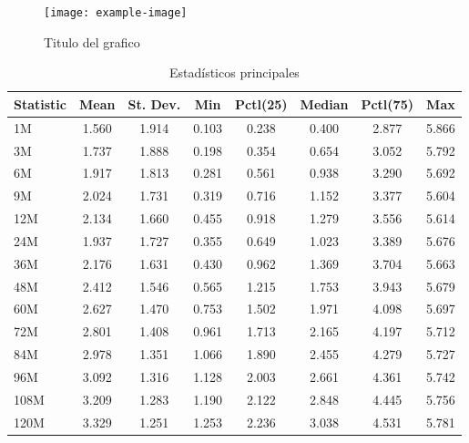 \documentclass{beamer}
\begin{document}
\begin{frame}
    \begin{figure}
        \caption{Titulo del grafico}
        \label{grafico_1}
        \texttt{[image: example-image]}
    \end{figure}
\end{frame}


\begin{frame}
    \begin{table} 
        \caption{Estadísticos principales} 
        \label{estadisticos} 
        \small
        \begin{tabular}{lccccccc}
            \toprule
            Statistic & Mean & St. Dev. & Min & Pctl(25) & Median & Pctl(75) & Max \\ 
            \midrule 
            1M & 1.560 & 1.914 & 0.103 & 0.238 & 0.400 & 2.877 & 5.866 \\ 
            3M & 1.737 & 1.888 & 0.198 & 0.354 & 0.654 & 3.052 & 5.792 \\ 
            6M & 1.917 & 1.813 & 0.281 & 0.561 & 0.938 & 3.290 & 5.692 \\ 
            9M & 2.024 & 1.731 & 0.319 & 0.716 & 1.152 & 3.377 & 5.604 \\ 
            12M & 2.134 & 1.660 & 0.455 & 0.918 & 1.279 & 3.556 & 5.614 \\ 
            24M & 1.937 & 1.727 & 0.355 & 0.649 & 1.023 & 3.389 & 5.676 \\ 
            36M & 2.176 & 1.631 & 0.430 & 0.962 & 1.369 & 3.704 & 5.663 \\ 
            48M & 2.412 & 1.546 & 0.565 & 1.215 & 1.753 & 3.943 & 5.679 \\ 
            60M & 2.627 & 1.470 & 0.753 & 1.502 & 1.971 & 4.098 & 5.697 \\ 
            72M & 2.801 & 1.408 & 0.961 & 1.713 & 2.165 & 4.197 & 5.712 \\ 
            84M & 2.978 & 1.351 & 1.066 & 1.890 & 2.455 & 4.279 & 5.727 \\ 
            96M & 3.092 & 1.316 & 1.128 & 2.003 & 2.661 & 4.361 & 5.742 \\ 
            108M & 3.209 & 1.283 & 1.190 & 2.122 & 2.848 & 4.445 & 5.756 \\ 
            120M & 3.329 & 1.251 & 1.253 & 2.236 & 3.038 & 4.531 & 5.781 \\ 
            \bottomrule
        \end{tabular} 
    \end{table} 
\end{frame}
\end{document}
